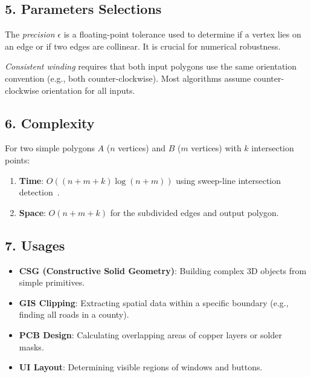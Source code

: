 \subsection{5. Parameters Selections}
\begin{definition}
\label{def:pb_epsilon}
The \emph{precision} $\epsilon$ is a floating-point tolerance used to determine if a vertex lies on an edge or if two edges are collinear. It is crucial for numerical robustness.
\end{definition}

\begin{definition}
\label{def:pb_consistent_winding}
\emph{Consistent winding} requires that both input polygons use the same orientation convention (e.g., both counter-clockwise). Most algorithms assume counter-clockwise orientation for all inputs.
\end{definition}

\subsection{6. Complexity}
\begin{theorem}
\label{thm:pb_complexity_summary}
For two simple polygons $A$ ($n$ vertices) and $B$ ($m$ vertices) with $k$ intersection points:
\begin{enumerate}
    \item \textbf{Time}: $O((n+m+k)\log(n+m))$ using sweep-line intersection detection~\cite{vatti1992}.
    \item \textbf{Space}: $O(n+m+k)$ for the subdivided edges and output polygon.
\end{enumerate}
\end{theorem}

\subsection{7. Usages}
\begin{itemize}
    \item \textbf{CSG (Constructive Solid Geometry)}: Building complex 3D objects from simple primitives.
    \item \textbf{GIS Clipping}: Extracting spatial data within a specific boundary (e.g., finding all roads in a county).
    \item \textbf{PCB Design}: Calculating overlapping areas of copper layers or solder masks.
    \item \textbf{UI Layout}: Determining visible regions of windows and buttons.
\end{itemize}

